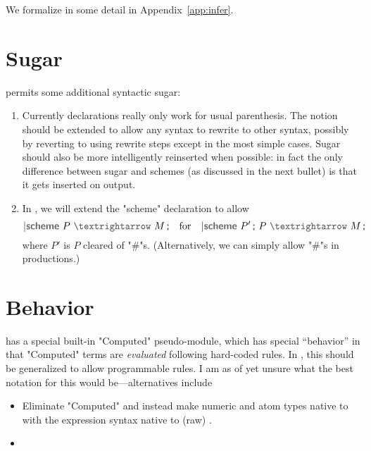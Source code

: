 \documentclass[11pt]{article} %
\begin{document}
We formalize in some detail in Appendix~\ref{app:infer}.


\section{Sugar}\label{sec:sugar}

 permits some additional syntactic sugar:
\begin{enumerate}

\item Currently  declarations really only work for usual parenthesis. The notion should be
  extended to allow any syntax to rewrite to other syntax, possibly by reverting to using rewrite
  steps except in the most simple cases. Sugar should also be more intelligently reinserted when
  possible: in fact the only difference between sugar and schemes (as discussed in the next bullet)
  is that it gets inserted on output.

\item In , we will extend the "scheme" declaration to allow
  \begin{displaymath}
    \kw{|scheme}~P~\kw{$→$}~M\,\kw;  \quad\text{for}\quad
    \kw{|scheme}~P'\,\kw; ~ P~\kw{$→$}~M\,\kw;
  \end{displaymath}
  where $P'$ is $P$ cleared of "#"s. (Alternatively, we can simply allow "#"s in productions.)

\end{enumerate}


\section{Behavior}\label{sec:behavior}

 has a special built-in "Computed" pseudo-module, which has special ``behavior'' in that
"Computed" terms are \emph{evaluated} following hard-coded rules. In , this should be
generalized to allow programmable rules.  I am as of yet unsure what the best notation for this
would be---alternatives include
\begin{itemize}

\item Eliminate "Computed" and instead make numeric and atom types native to \HAX with the
  expression syntax native to (raw) \HAX.

\item 

\end{itemize}
\end{document}
